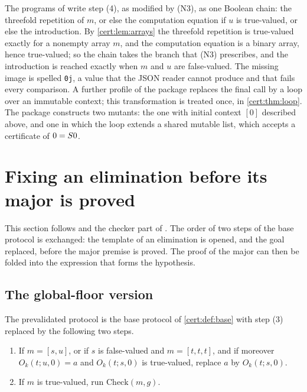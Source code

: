 The programs of  write step (4), as modified by (N3), as
one Boolean chain: the threefold repetition of $m$, or else the computation
equation if $u$ is true-valued, or else the introduction. By
\cref{cert:lem:arrays} the threefold repetition is true-valued exactly for a
nonempty array $m$, and the computation equation is a binary array, hence
true-valued; so the chain takes the branch that (N3) prescribes, and the
introduction is reached exactly when $m$ and $u$ are false-valued. The
missing image is spelled \texttt{0j}, a value that the JSON reader cannot
produce and that fails every comparison. A further profile of the package
replaces the final call by a loop over an immutable context; this
transformation is treated once, in \cref{cert:thm:loop}. The package constructs
two mutants: the one with initial context $[0]$ described above, and one in
which the loop extends a shared mutable list, which accepts a certificate of
$0=S 0$.

\section{Fixing an elimination before its major is proved}\label{cert:sec:order}

This section follows  and the checker part of
. The order of two steps of the base protocol is
exchanged: the template of an elimination is opened, and the goal replaced,
before the major premise is proved. The proof of the major can then be folded
into the expression that forms the hypothesis.

\subsection{The global-floor version}

\begin{definition}\label{cert:def:preval}
The prevalidated protocol is the base protocol of \cref{cert:def:base} with
step (3) replaced by the following two steps.
\begin{enumerate}
\item[($3'$)] If $m=[s,u]$, or if $s$ is false-valued and $m=[t,t,t]$, and if
moreover $O_k(t;u,0)=a$ and $O_k(t;s,0)$ is true-valued, replace $a$ by
$O_k(t;s,0)$.
\item[($3''$)] If $m$ is true-valued, run $\mathrm{Check}(m,g)$.
\end{enumerate}
\end{definition}

